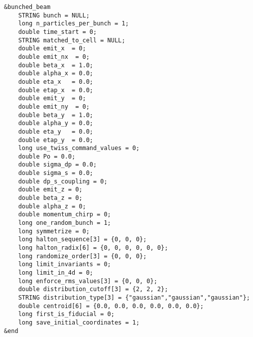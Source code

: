 \documentclass[11pt]{article}
\begin{document}
\begin{verbatim}
&bunched_beam
    STRING bunch = NULL;
    long n_particles_per_bunch = 1;
    double time_start = 0;
    STRING matched_to_cell = NULL;
    double emit_x  = 0;
    double emit_nx  = 0;
    double beta_x  = 1.0;
    double alpha_x = 0.0;
    double eta_x   = 0.0;
    double etap_x  = 0.0;
    double emit_y  = 0;
    double emit_ny  = 0;
    double beta_y  = 1.0;
    double alpha_y = 0.0;
    double eta_y   = 0.0;
    double etap_y  = 0.0;
    long use_twiss_command_values = 0;
    double Po = 0.0;
    double sigma_dp = 0.0;
    double sigma_s = 0.0;
    double dp_s_coupling = 0;
    double emit_z = 0;
    double beta_z = 0;
    double alpha_z = 0;
    double momentum_chirp = 0;
    long one_random_bunch = 1;
    long symmetrize = 0;
    long halton_sequence[3] = {0, 0, 0};
    long halton_radix[6] = {0, 0, 0, 0, 0, 0};
    long randomize_order[3] = {0, 0, 0};
    long limit_invariants = 0;
    long limit_in_4d = 0;
    long enforce_rms_values[3] = {0, 0, 0};
    double distribution_cutoff[3] = {2, 2, 2};
    STRING distribution_type[3] = {"gaussian","gaussian","gaussian"};
    double centroid[6] = {0.0, 0.0, 0.0, 0.0, 0.0, 0.0};
    long first_is_fiducial = 0;
    long save_initial_coordinates = 1;
&end
\end{verbatim}
\end{document}
